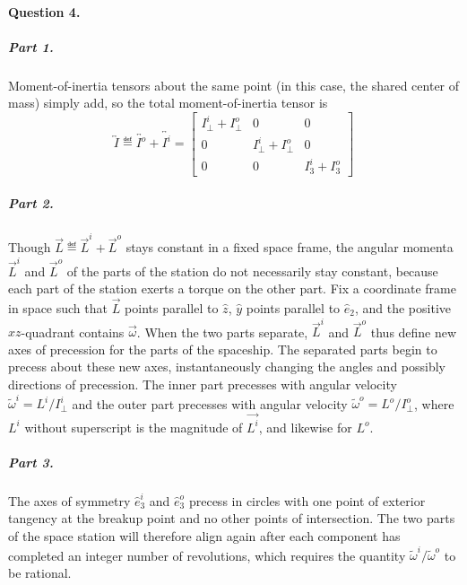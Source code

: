 \paragraph{Question 4.}

\subparagraph{Part 1.}  Moment-of-inertia tensors about the same point (in this case, the shared center of mass) simply add, so the total moment-of-inertia tensor is $$\overleftrightarrow{I}
\eqdef \overleftrightarrow{I^o} + \overleftrightarrow{I^i} =
\begin{bmatrix}
I_\bot^i + I_\bot^o & 0 & 0 \\
0 & I_\bot^i + I_\bot^o & 0 \\
0 & 0 & I_3^i + I_3^o
\end{bmatrix}$$

\subparagraph{Part 2.}

Though $\vec{L} \eqdef \vec{L}^i + \vec{L}^o$ stays constant in a fixed space frame, the angular momenta $\vec{L}^i$ and $\vec{L}^o$ of the parts of the station do not necessarily stay constant, because each part of the station exerts a torque on the other part.  Fix a coordinate frame in space such that $\vec{L}$ points parallel to $\hat{z}$, $\hat{y}$ points parallel to $\hat{e}_2$, and the positive $xz$-quadrant contains $\vec{\omega}$. When the two parts separate, $\vec{L}^i$ and $\vec{L}^o$ thus define new axes of precession for the parts of the spaceship.  The separated parts begin to precess about these new axes, instantaneously changing the angles and possibly directions of precession.  The inner part precesses with angular velocity $\tilde{\omega}^i = L^i/I_\bot^i$ and the outer part precesses with angular velocity $\tilde{\omega}^o = L^o/I_{\bot}^o$, where $L^i$ without superscript is the magnitude of $\vec{L^i}$, and likewise for $L^o$.

\subparagraph{Part 3.}

The axes of symmetry $\hat{e}_3^i$ and $\hat{e}_3^o$ precess in circles with one point of exterior tangency at the breakup point and no other points of intersection.  The two parts of the space station will therefore align again after each component has completed an integer number of revolutions, which requires the quantity $\tilde{\omega}^i / \tilde{\omega}^o$ to be rational.

